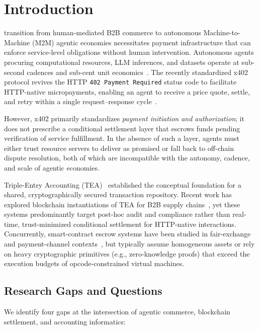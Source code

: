 \documentclass[journal]{IEEEtran}
\begin{document}
\IEEEpeerreviewmaketitle

\section{Introduction}
 transition from human-mediated B2B commerce to
autonomous Machine-to-Machine (M2M) agentic economies necessitates
payment infrastructure that can enforce service-level obligations
without human intervention.
Autonomous agents procuring computational resources, LLM inferences,
and datasets operate at sub-second cadences and sub-cent unit
economics~\cite{x402spec}.
The recently standardized x402 protocol revives the HTTP
\texttt{402 Payment Required} status code to facilitate HTTP-native
micropayments, enabling an agent to receive a price quote, settle,
and retry within a single request--response
cycle~\cite{x402spec,x402facilitator}.

However, x402 primarily standardizes \emph{payment initiation and
authorization}; it does not prescribe a conditional settlement layer
that escrows funds pending verification of service fulfillment.
In the absence of such a layer, agents must either trust resource
servers to deliver as promised or fall back to off-chain dispute
resolution, both of which are incompatible with the autonomy,
cadence, and scale of agentic economies.

Triple-Entry Accounting (TEA)~\cite{grigg2005,boyle2001} established
the conceptual foundation for a shared, cryptographically secured
transaction repository.
Recent work has explored blockchain instantiations of TEA for B2B
supply chains~\cite{ibanez2023,sarwar2023}, yet these systems
predominantly target post-hoc audit and compliance rather than
real-time, trust-minimized conditional settlement for HTTP-native
interactions.
Concurrently, smart-contract escrow systems have been studied in
fair-exchange and payment-channel
contexts~\cite{asokan2004,pagnia2003}, but typically assume
homogeneous assets or rely on heavy cryptographic primitives
(e.g., zero-knowledge proofs) that exceed the execution budgets of
opcode-constrained virtual machines.

\subsection{Research Gaps and Questions}
We identify four gaps at the intersection of agentic commerce,
blockchain settlement, and accounting informatics:
\end{document}
